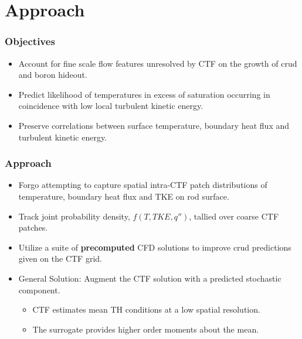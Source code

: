 \documentclass[t, pdftex]{beamer}
\begin{document}
\section{Approach}
\begin{frame}\frametitle{Objectives}
\begin{itemize}
    \item Account for fine scale flow features unresolved by CTF on the growth of crud and boron hideout. \\

    \item Predict likelihood of temperatures in excess of saturation occurring in coincidence with low local turbulent kinetic energy. \\
    
    \item Preserve correlations between surface temperature, boundary heat flux and turbulent kinetic energy.
\end{itemize}
\end{frame}

\begin{frame}\frametitle{Approach}
\begin{itemize}
\item Forgo attempting to capture spatial intra-CTF patch distributions of temperature, boundary heat flux and TKE on rod surface. 
\item Track joint probability density, $f(T, TKE, q'')$, tallied over coarse CTF patches.
    \item Utilize a suite of \textbf{precomputed} CFD solutions to improve crud predictions given on the CTF grid. 
    \item General Solution: Augment the CTF solution with a predicted stochastic component.
    \begin{itemize}
        \item CTF estimates mean TH conditions at a low spatial resolution.  
        \item The surrogate provides higher order moments about the mean.
    \end{itemize}
\end{itemize}
\end{frame}
\end{document}
